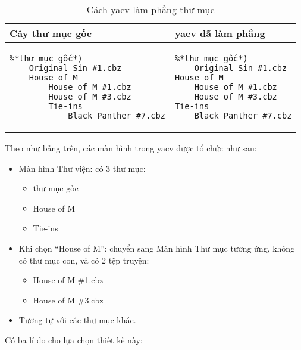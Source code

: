 \documentclass[../../thesis]{subfiles}
\begin{document}
\begin{table}[H]
    \centering
    \caption{Cách yacv làm phẳng thư mục}
    \label{tab:yacv-flattening}
    \begin{tabular}{ll}
        \toprule
        Cây thư mục gốc & yacv đã làm phẳng \\
        \midrule
        \begin{lstlisting}
%*thư mục gốc*)
    Original Sin #1.cbz
    House of M
        House of M #1.cbz
        House of M #3.cbz
        Tie-ins
            Black Panther #7.cbz
        \end{lstlisting}
        &
        \begin{lstlisting}
%*thư mục gốc*)
    Original Sin #1.cbz
House of M
    House of M #1.cbz
    House of M #3.cbz
Tie-ins
    Black Panther #7.cbz
        \end{lstlisting}
        \\
        \bottomrule
    \end{tabular}
\end{table}

Theo như bảng trên, các màn hình trong yacv được tổ chức như sau:

\begin{itemize}
    \item
        Màn hình Thư viện: có 3 thư mục:

        \begin{itemize}
            \item
                thư mục gốc
            \item
                House of M
            \item
                Tie-ins
        \end{itemize}
    \item
        Khi chọn ``House of M'': chuyển sang Màn hình Thư mục tương ứng, không
        có thư mục con, và có 2 tệp truyện:

        \begin{itemize}
            \item
                House of M \#1.cbz
            \item
                House of M \#3.cbz
        \end{itemize}
    \item
        Tương tự với các thư mục khác.
\end{itemize}

Có ba lí do cho lựa chọn thiết kế này:
\end{document}
